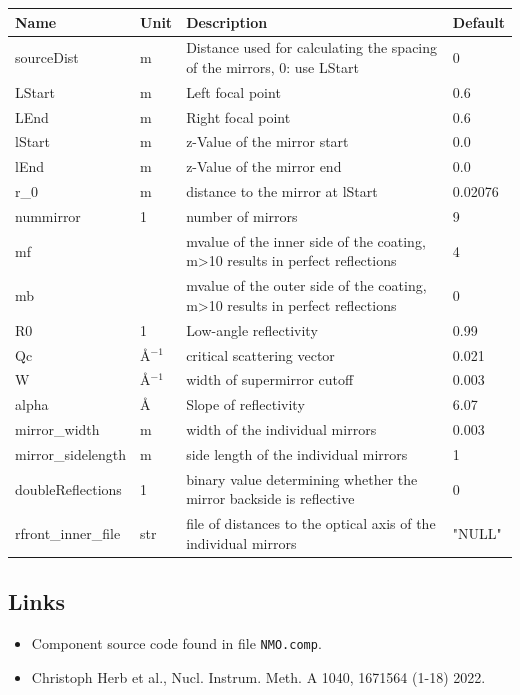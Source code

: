 \begin{longtable}{p{}p{}p{}p{}}
\toprule
\textbf{Name} & \textbf{Unit} & \textbf{Description} & \textbf{Default} \\
\midrule
\endhead
sourceDist & m & Distance used for calculating the spacing of the mirrors, 0: use LStart & 0 \\
LStart & m & Left focal point & 0.6 \\
LEnd & m & Right focal point & 0.6 \\
lStart & m & z-Value of the mirror start & 0.0 \\
lEnd & m & z-Value of the mirror end & 0.0 \\
r\_0 & m & distance to the mirror at lStart & 0.02076 \\
nummirror & 1 & number of mirrors & 9 \\
mf &   & mvalue of the inner side of the coating, m\textgreater{}10 results in perfect reflections & 4 \\
mb &   & mvalue of the outer side of the coating, m\textgreater{}10 results in perfect reflections & 0 \\
R0 & 1 & Low-angle reflectivity & 0.99 \\
Qc & \AA{}$^{-1}$ & critical scattering vector & 0.021 \\
W & \AA{}$^{-1}$ & width of supermirror cutoff & 0.003 \\
alpha & \AA{} & Slope of reflectivity & 6.07 \\
mirror\_width & m & width of the individual mirrors & 0.003 \\
mirror\_sidelength & m & side length of the individual mirrors & 1 \\
doubleReflections & 1 & binary value determining whether the mirror backside is reflective & 0 \\
rfront\_inner\_file & str & file of distances to the optical axis of the individual mirrors & "NULL" \\
\bottomrule
\end{longtable}

\subsection*{Links}
\begin{itemize}
  \item Component source code found in file \texttt{NMO.comp}.
  \item Christoph Herb et al., Nucl. Instrum. Meth. A 1040, 1671564 (1-18) 2022.
\end{itemize}
